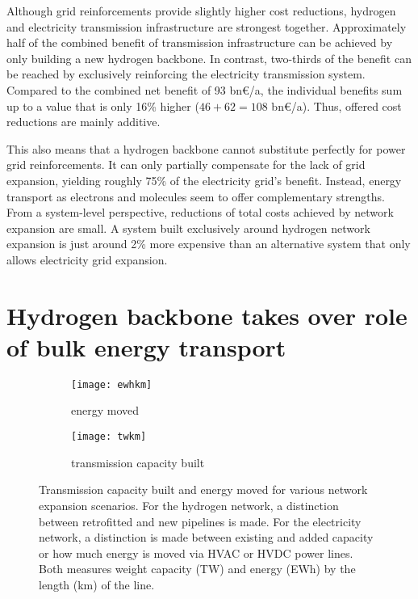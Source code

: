 
Although grid reinforcements provide slightly higher cost reductions, hydrogen and
electricity transmission infrastructure are strongest together. Approximately
half of the combined benefit of transmission infrastructure can be achieved by
only building a new hydrogen backbone. In contrast, two-thirds of the benefit
can be reached by exclusively reinforcing the electricity transmission system.
Compared to the combined net benefit of 93 bn\euro/a, the individual benefits
sum up to a value that is only 16\% higher ($46+62=108$ bn\euro/a). Thus,
offered cost reductions are mainly additive.


This also means that a hydrogen backbone cannot substitute perfectly for power
grid reinforcements. It can only partially compensate for the lack of grid
expansion, yielding roughly 75\% of the electricity grid's benefit. Instead,
energy transport as electrons and molecules seem to offer complementary
strengths. From a system-level perspective, reductions of total costs achieved
by network expansion are small. A system built exclusively around hydrogen
network expansion is just around 2\% more expensive than an alternative system
that only allows electricity grid expansion. %


\section*{Hydrogen backbone takes over role of bulk energy transport}
\label{sec:energy-moved}

\begin{figure}
    \centering
        \begin{subfigure}[t]{0.49\textwidth}
            \centering
            \caption{energy moved}
            \texttt{[image: ewhkm]}
            \label{fig:network-stats:ewhkm}
        \end{subfigure}
        \begin{subfigure}[t]{0.49\textwidth}
            \centering
            \caption{transmission capacity built}
            \texttt{[image: twkm]}
            \label{fig:network-stats:twkm}
        \end{subfigure}
    \caption{Transmission capacity built and energy moved for various network
        expansion scenarios. For the hydrogen network, a distinction between
        retrofitted and new pipelines is made. For the electricity network, a
        distinction is made between existing and added capacity or how much
        energy is moved via HVAC or HVDC power lines. Both measures weight
        capacity (TW) and energy (EWh) by the length (km) of the line.}
    \label{fig:network-stats}
\end{figure}

